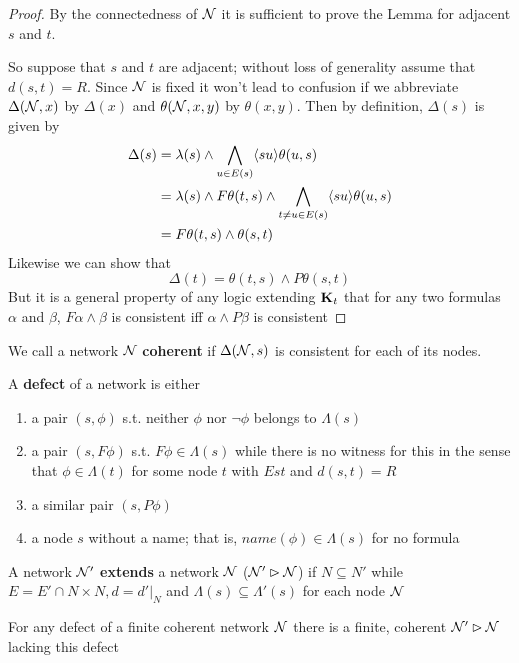 \documentclass[11pt]{article}
\begin{document}
\begin{proof}
By the connectedness of \(\mathcal{N}\) it is sufficient to prove the Lemma for
adjacent \(s\) and \(t\).

So suppose that \(s\) and \(t\) are adjacent; without loss of generality
assume that \(d(s,t)=R\). Since \(\mathcal{N}\) is fixed it won't lead to confusion
if we abbreviate \(\Delta(\mathcal{N},x)\) by \(\Delta(x)\) and \(\theta(\mathcal{N},x,y)\) by
\(\theta(x,y)\). Then by definition, \(\Delta(s)\) is given by
\begin{align*}
\Delta(s)&=\lambda(s)\wedge\bigwedge_{u\in E(s)}\langle su\rangle\theta(u,s)\\
&=\lambda(s)\wedge F\theta(t,s)\wedge\bigwedge_{t\neq u\in E(s)}\langle su\rangle\theta(u,s)\\
&=F\theta(t,s)\wedge\theta(s,t)
\end{align*}
Likewise we can show that
\begin{equation*}
\Delta(t)=\theta(t,s)\wedge P\theta(s,t)
\end{equation*}
But it is a general property of any logic extending \(\operatorname{\textbf{K}}_t\) that for any
two formulas \(\alpha\) and \(\beta\), \(F\alpha\wedge\beta\) is consistent iff \(\alpha\wedge
   P\beta\) is consistent
\end{proof}

We call a network \(\mathcal{N}\) \textbf{coherent} if \(\Delta(\mathcal{N},s)\) is consistent for each
of its nodes.

A \textbf{defect} of a network is either
\begin{enumerate}
\item a pair \((s,\phi)\) s.t. neither \(\phi\) nor \(\neg\phi\) belongs to \(\Lambda(s)\)
\item a pair \((s,F\phi)\) s.t.  \(F\phi\in\Lambda(s)\) while there is no
witness for this in the sense that \(\phi\in\Lambda(t)\) for some node
\(t\) with \(Est\) and \(d(s,t)=R\)
\item a similar pair \((s,P\phi)\)
\item a node \(s\) without a name; that is, \(name(\phi)\in\Lambda(s)\) for no formula
\end{enumerate}


A network \(\mathcal{N}'\) \textbf{extends} a network \(\mathcal{N}\) (\(\mathcal{N}'\rhd\mathcal{N}\)) if
\(N\subseteq N'\) while \(E=E'\cap N\times N,d=d'\vert_N\) and
\(\Lambda(s)\subseteq\Lambda'(s)\) for each node \(\mathcal{N}\)

\begin{lemma}[]
For any defect of a finite coherent network \(\mathcal{N}\) there is a finite,
coherent \(\mathcal{N}'\rhd\mathcal{N}\) lacking this defect
\end{lemma}
\end{document}
